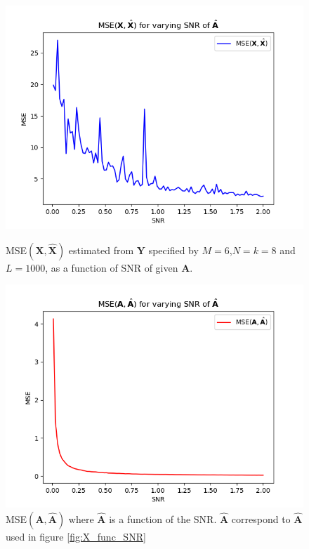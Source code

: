 \begin{figure}[H]
    \begin{minipage}[t]{.45\textwidth}
    	\centering
		\includegraphics[scale=0.5]{figures/ch_6/X_func_SNR.png}
		\caption{MSE$(\textbf{X},\hat{\textbf{X}})$ estimated from $\textbf{Y}$ specified by $M=6$,$N=k=8$ and $L=1000$, as a function of SNR of given $\textbf{A}$. }
		\label{fig:X_func_SNR}
    \end{minipage} 
    \hfill
    \begin{minipage}[t]{.45\textwidth}
        \centering
		\includegraphics[scale=0.5]{figures/ch_6/A_func_SNR.png}
		\caption{MSE$(\textbf{A},\hat{\textbf{A}})$ where $\hat{\textbf{A}}$ is a function of the SNR. $\hat{\textbf{A}}$ correspond to $\hat{\textbf{A}}$ used in figure \ref{fig:X_func_SNR}}
		\label{fig:A_func_SNR}
    \end{minipage}
\end{figure}